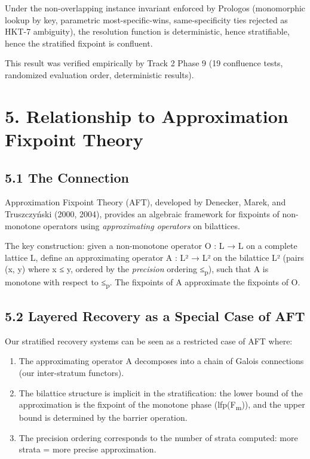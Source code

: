 \documentclass[11pt]{article}
\begin{document}
Under the non-overlapping instance invariant enforced by Prologos (monomorphic
lookup by key, parametric most-specific-wins, same-specificity ties rejected as
HKT-7 ambiguity), the resolution function is deterministic, hence stratifiable,
hence the stratified fixpoint is confluent.

This result was verified empirically by Track 2 Phase 9 (19 confluence tests,
randomized evaluation order, deterministic results).
\section{5. Relationship to Approximation Fixpoint Theory}
\label{sec:org7fdfd5c}

\subsection{5.1 The Connection}
\label{sec:org80f0459}

Approximation Fixpoint Theory (AFT), developed by Denecker, Marek, and
Truszczyński (2000, 2004), provides an algebraic framework for fixpoints of
non-monotone operators using \emph{approximating operators} on bilattices.

The key construction: given a non-monotone operator O : L → L on a complete
lattice L, define an approximating operator A : L² → L² on the bilattice L²
(pairs (x, y) where x ≤ y, ordered by the \emph{precision} ordering ≤\textsubscript{p}), such that
A is monotone with respect to ≤\textsubscript{p}. The fixpoints of A approximate the fixpoints
of O.
\subsection{5.2 Layered Recovery as a Special Case of AFT}
\label{sec:orgfe00435}

Our stratified recovery systems can be seen as a restricted case of AFT where:

\begin{enumerate}
\item The approximating operator A decomposes into a chain of Galois connections
(our inter-stratum functors).
\item The bilattice structure is implicit in the stratification: the lower bound
of the approximation is the fixpoint of the monotone phase (lfp(F\textsubscript{m})), and
the upper bound is determined by the barrier operation.
\item The precision ordering corresponds to the number of strata computed:
more strata = more precise approximation.
\end{enumerate}
\end{document}
